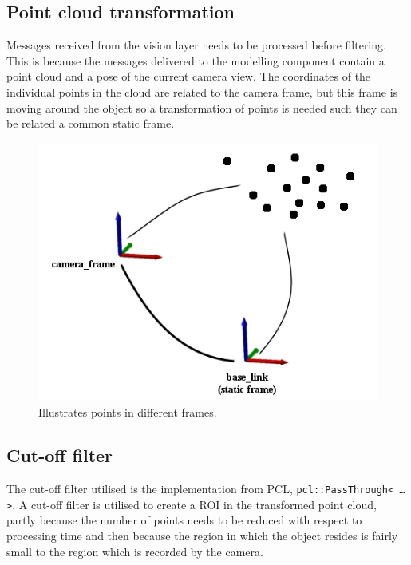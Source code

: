 \subsection{Point cloud transformation}
Messages received from the vision layer needs to be processed before filtering. This is because the messages delivered to the modelling component contain a point cloud and a pose of the current camera view. The coordinates of the individual points in the cloud are related to the camera frame, but this frame is moving around the object so a transformation of points is needed such they can be related a common static frame.

\begin{figure}[htb]
	\begin{center}
		\includegraphics[scale=0.7,trim=0 0 0 0]{graphics/07_modelling/pctransform.png}%
		\caption{Illustrates points in different frames.}
		\label{fig:filtering_transform}
	\end{center}
\end{figure}

\subsection{Cut-off filter}
The cut-off filter utilised is the implementation from PCL, \texttt{pcl::PassThrough< \ldots >}. A cut-off filter is utilised to create a ROI in the transformed point cloud, partly because the number of points needs to be reduced with respect to processing time and then because the region in which the object resides is fairly small to the region which is recorded by the camera.

